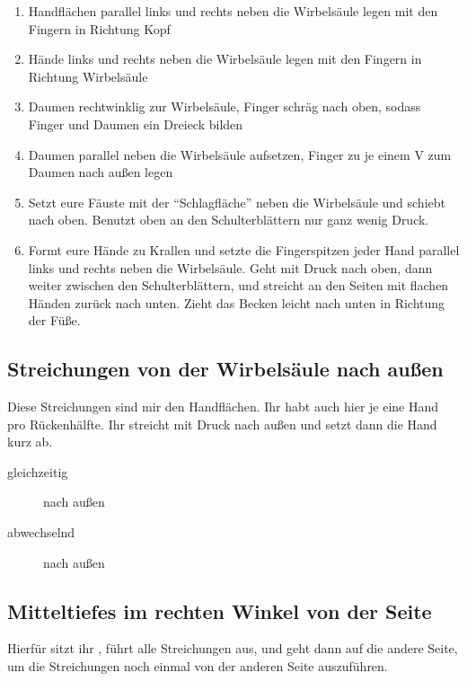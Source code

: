 \begin{enumerate}
  \item {} Handflächen parallel links und rechts neben die Wirbelsäule legen mit den Fingern in Richtung Kopf
  \item {} Hände links und rechts neben die Wirbelsäule legen mit den Fingern in Richtung Wirbelsäule
  \item {} Daumen rechtwinklig zur Wirbelsäule, Finger schräg nach oben, sodass Finger und Daumen ein Dreieck bilden
  \item {} Daumen parallel neben die Wirbelsäule aufsetzen, Finger zu je einem V zum Daumen nach außen legen
  \item {} Setzt eure Fäuste mit der ``Schlagfläche'' neben die Wirbelsäule und schiebt nach oben. Benutzt oben an den Schulterblättern nur ganz wenig Druck.
  \item {} Formt eure Hände zu Krallen und setzte die Fingerspitzen jeder Hand parallel links und rechts neben die Wirbelsäule. Geht mit Druck nach oben, dann weiter zwischen den Schulterblättern, und streicht an den Seiten mit flachen Händen zurück nach unten. Zieht das Becken leicht nach unten in Richtung der Füße.
\end{enumerate}


\subsection{Streichungen von der Wirbelsäule nach außen}

Diese Streichungen sind mir den Handflächen. Ihr habt auch hier je eine Hand pro Rückenhälfte. Ihr streicht mit Druck nach außen und setzt dann die Hand kurz ab.

\begin{description}
  \item [gleichzeitig] nach außen
  \item [abwechselnd] nach außen
\end{description}


\subsection{Mitteltiefes im rechten Winkel von der Seite}
Hierfür sitzt ihr , führt alle Streichungen aus, und geht dann auf die andere Seite, um die Streichungen noch einmal von der anderen Seite auszuführen.

